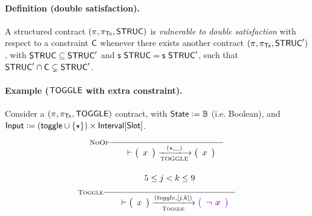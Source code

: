 \paragraph{Definition (double satisfaction). }
\label{def:ds}
A structured contract $(\pi, \pi_{\mathsf{Tx}}, \mathsf{STRUC})$ is \emph{vulnerable to double satisfaction}
with respect to a constraint $\mathsf{C}$
whenever there exists another contract $(\pi, \pi_{\mathsf{Tx}}, \mathsf{STRUC}')$, with $\mathsf{STRUC} \subseteq \mathsf{STRUC}'$
and $\mathsf{s}~\mathsf{STRUC} = \mathsf{s}~\mathsf{STRUC}'$,
such that $\mathsf{STRUC}' \cap \mathsf{C} \subsetneq \mathsf{STRUC}'$.

\paragraph{Example ($\mathsf{TOGGLE}$ with extra constraint). }
\label{ex:toggle}
Consider a $(\pi, \pi_{\mathsf{Tx}}, \mathsf{TOGGLE})$ contract, with $\mathsf{State} \mathrel{\mathop:}= \mathbb{B}$ (i.e. Boolean),
and $\mathsf{Input} \mathrel{\mathop:}= (\mathsf{toggle} \cup \{\star\}) \times \textsf{Interval}[\textsf{Slot}]$. \newline


\begin{minipage}{.45\textwidth}
  \begin{equation*}
    \inference[\textsc{NoOp}]
    { \\
    }
    {
    \begin{array}{l}
      \\
    \end{array}
      \vdash
      \left(
      \begin{array}{r}
        x
      \end{array}
      \right)
      \trans{TOGGLE}{(\emptytype, \_)}
      \left(
      \begin{array}{r}
        x
      \end{array}
      \right) \\
    }
  \end{equation*}
\end{minipage}
\begin{minipage}{.45\textwidth}
  \begin{equation*}
    \label{eq:j}
    \inference[\textsc{Toggle}]
    {~\\
    5 \leq j < k \leq 9 \\~\\
    }
    {
    \begin{array}{l}
      \\
    \end{array}
      \vdash
      \left(
      \begin{array}{r}
        x
      \end{array}
      \right)
      \trans{Toggle}{(toggle, [j, k])}
      \varUpdate{\left(
      \begin{array}{r}
        \neg~x
      \end{array}
      \right) } \\
    } \\
  \end{equation*}
\end{minipage}

